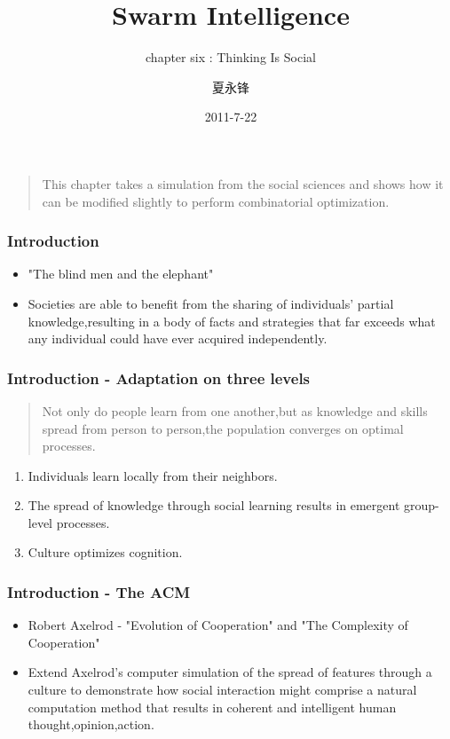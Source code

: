 \documentclass[CJK]{beamer}
\begin{document}
\begin{CJK*}{GBK}{song}

\title{Swarm Intelligence}
\subtitle{chapter six : Thinking Is Social}
\author{夏永锋}
\date{2011-7-22}

\begin{frame}
\maketitle
\end{frame}

\begin{frame}
\begin{quote}
\textcolor[rgb]{0.00,0.50,1.00}
{
This chapter takes a simulation from the social sciences and shows how it can be modified slightly to
perform combinatorial optimization.
}
\end{quote}
\end{frame}

\begin{frame}
\frametitle{Introduction}
\begin{itemize}
\item{"The blind men and the elephant"}
\item{Societies are able to benefit from the sharing of individuals' partial knowledge,resulting in a body of facts and strategies that far exceeds what any individual could have ever acquired independently.}
\end{itemize}
\end{frame}

\begin{frame}
\frametitle{Introduction - Adaptation on three levels}
\begin{quote}
\textcolor[rgb]{0.00,0.50,0.75}
{Not only do people learn from one another,but as knowledge and skills spread from person to person,the population converges on optimal processes.}
\end{quote}
\begin{enumerate}
\item{Individuals learn locally from their neighbors.}
\item{The spread of knowledge through social learning results in emergent group-level processes.}
\item{Culture optimizes cognition.}
\end{enumerate}
\end{frame}

\begin{frame}
\frametitle{Introduction - The ACM}
\begin{itemize}
\item{Robert Axelrod - "Evolution of Cooperation" and "The Complexity of Cooperation"}
\item{Extend Axelrod's computer simulation of the spread of features through a culture to demonstrate how social interaction might comprise a natural computation method that results in coherent and intelligent human thought,opinion,action.}
\end{itemize}
\end{frame}


\end{CJK*}
\end{document}
